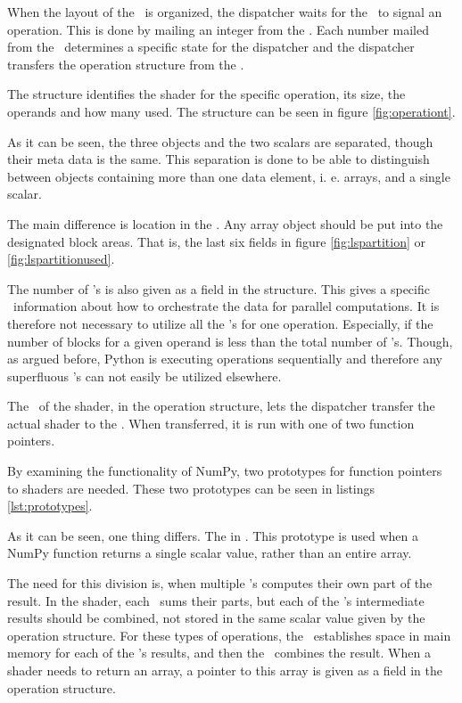 When the layout of the \LS\ is organized, the dispatcher waits for the
\PPE\ to signal an operation. This is done by mailing an integer from
the \PPE{}. Each number mailed from the \PPE\ determines a specific
state for the dispatcher and the dispatcher transfers the operation
structure from the \PPE{}.

The structure identifies the shader for the specific operation, its
size, the operands and how many  used. The structure can be
seen in figure \ref{fig:operationt}.


As it can be seen, the three objects and the two scalars are
separated, though their meta data is the same. This separation is done
to be able to distinguish between objects containing more than one
data element, i. e. arrays, and a single scalar.

The main difference is location in the \LS{}. Any array object should
be put into the designated block areas. That is, the last six fields
in figure \ref{fig:lspartition} or \ref{fig:lspartitionused}.

The number of \SPE{}'s is also given as a field in the structure. This
gives a specific \SPE\ information about how to orchestrate the data
for parallel computations. It is therefore not necessary to utilize all
the \SPE{}'s for one operation. Especially, if the number of blocks
for a given operand is less than the total number of \SPE{}'s. Though,
as argued before, Python is executing operations sequentially and
therefore any superfluous \SPE{}'s can not easily be utilized
elsewhere.

The \EA\ of the shader, in the operation structure, lets the
dispatcher transfer the actual shader to the \LS{}. When transferred,
it is run with one of two function pointers.

By examining the functionality of NumPy, two prototypes for function
pointers to shaders are needed. These two prototypes can be seen in
listings \ref{lst:prototypes}.


As it can be seen, one thing differs. The  in
. This prototype is used when a NumPy function
returns a single scalar value, rather than an entire array.

The need for this division is, when multiple \SPE{}'s computes their
own part of the result. In the  shader, each \SPE\ sums
their parts, but each of the \SPE{}'s intermediate results should be
combined, not stored in the same scalar value given by the operation
structure. For these types of operations, the \PPE\ establishes space
in main memory for each of the \SPE{}'s results, and then the
\PPE\ combines the result. When a shader needs to return an array, a
pointer to this array is given as a field in the operation structure.

